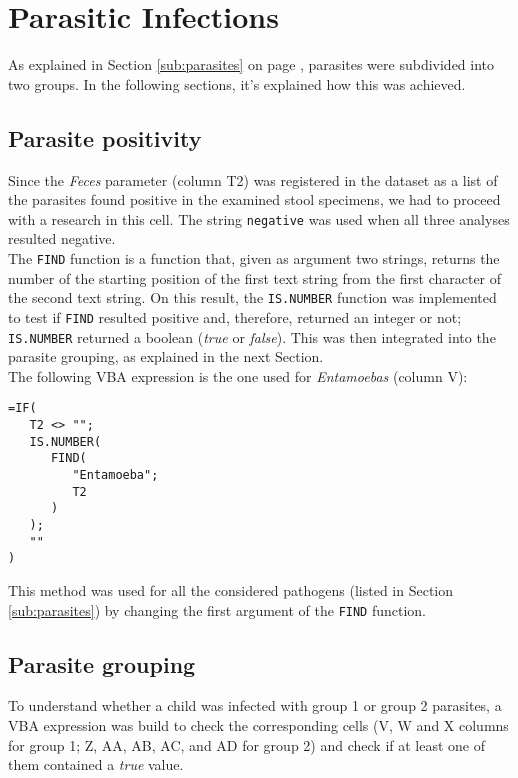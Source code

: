 \section{Parasitic Infections}\label{asec:parasiticinfections}
As explained in Section \ref{sub:parasites} on page \pageref{sub:parasites}, parasites were subdivided into two groups. In the following sections, it's explained how this was achieved.

\subsection{Parasite positivity}\label{asub:parasitespos}
Since the \textit{Feces} parameter (column T2) was registered in the dataset as a list of the parasites found positive in the examined stool specimens, we had to proceed with a research in this cell. The string \texttt{negative} was used when all three analyses resulted negative.\\
The \texttt{FIND} function is a function that, given as argument two strings, returns the number of the starting position of the first text string from the first character of the second text string. On this result, the \texttt{IS.NUMBER} function was implemented to test if \texttt{FIND} resulted positive and, therefore, returned an integer or not; \texttt{IS.NUMBER} returned a boolean (\textit{true} or \textit{false}). This was then integrated into the parasite grouping, as explained in the next Section.\\
The following VBA expression is the one used for \textit{Entamoebas} (column V):

\begin{lstlisting}
=IF(
   T2 <> "";
   IS.NUMBER(
      FIND(
         "Entamoeba";
         T2
      )
   );
   ""
)
\end{lstlisting}

This method was used for all the considered pathogens (listed in Section \ref{sub:parasites}) by changing the first argument of the \texttt{FIND} function.

\subsection{Parasite grouping}\label{asub:parasitegrouping}
To understand whether a child was infected with group 1 or group 2 parasites, a VBA expression was build to check the corresponding cells (V, W and X columns for group 1; Z, AA, AB, AC, and AD for group 2) and check if at least one of them contained a \textit{true} value.


